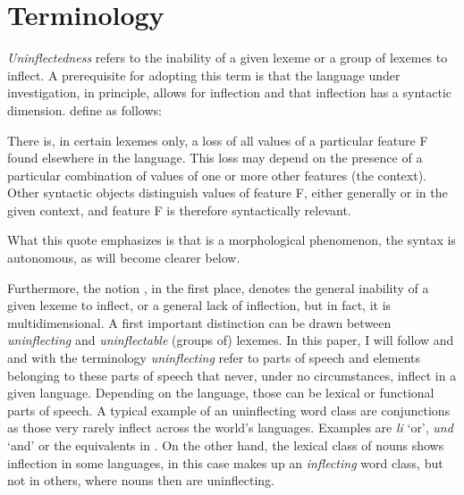 \documentclass[output=paper,colorlinks,citecolor=brown]{langscibook}
\begin{document}
\section{Terminology} \label{12sec2}

\textit{Uninflectedness} refers to the inability of a given lexeme or a group of lexemes to inflect. A prerequisite for adopting this term is that the language under investigation, in principle, allows for inflection and that inflection has a syntactic dimension. \citet[33]{baermanbrowncorbett2005} define  as follows:

\begin{exe}
	\ex \label{12ex2}
	\begin{xlist}
		 There is, in certain lexemes only, a loss of all values of a particular feature F found elsewhere in the language. This loss may depend on the presence of a particular combination of values of one or more other features (the context).
		 Other syntactic objects distinguish values of feature F, either generally or in the given context, and feature F is therefore syntactically relevant.
	\end{xlist}
\end{exe}

What this quote emphasizes is that  is a morphological phenomenon, the syntax is autonomous, as will become clearer below.

Furthermore, the notion \emph{}, in the first place, denotes the general inability of a given lexeme to inflect, or a general lack of inflection, but in fact, it is multidimensional. A first important distinction can be drawn between \textit{uninflecting} and \textit{uninflectable} (groups of) lexemes. In this paper, I will follow \citet[142]{spencer2020} and \citet{baermanbrowncorbett2005, baermanbrowncorbett2017} and with the terminology \textit{uninflecting} refer to parts of speech and elements belonging to these parts of speech that never, under no circumstances, inflect in a given language. Depending on the language, those can be lexical or functional parts of speech. A typical example of an uninflecting word class are conjunctions as those very rarely inflect across the world's languages. Examples are  \emph{li} `or',  \emph{und} `and' or the equivalents in . On the other hand, the lexical class of nouns shows inflection in some languages, in this case makes up an \textit{inflecting} word class, but not in others, where nouns then are uninflecting.
\end{document}
